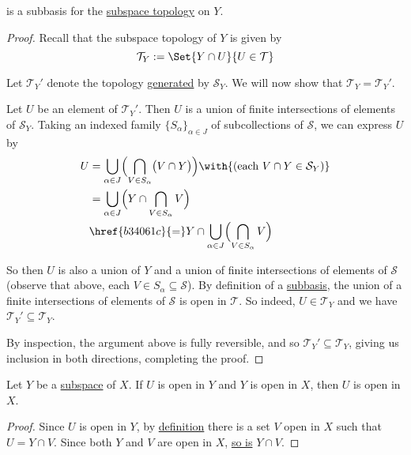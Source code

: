 is a subbasis for the \href{cddfbd8}{subspace topology} on $Y$.

\begin{proof}
  \def\T{\mathcal T}\def\TY{\mathcal T_Y}
  \def\S{\mathcal S}\def\SY{\mathcal S_Y}

  Recall that the subspace topology of $Y$ is given by
  $$
    \TY:=\Set{Y\cap U}{U\in\T}
  $$

  Let $\TY'$ denote the topology \href{d1d3329}{generated} by $\SY$. We will
  now show that $\TY=\TY'$.

  Let $U$ be an element of $\TY'$. Then $U$ is a union of finite intersections
  of elements of $\SY$. Taking an indexed family $\{S_\alpha\}_{\alpha\in J}$
  of subcollections of $\S$, we can express $U$ by
  \begin{align*}
    U &=\bigcup_{\alpha\in J}\Bigl(\bigcap_{V\in S_\alpha}\bigl(V\cap Y\bigr)\Bigr)\with{(\text{each }V\cap Y\in\SY)} \\
      &=\bigcup_{\alpha\in J}\Bigl(Y\cap\bigcap_{V\in S_\alpha}V\Bigr)                                                \\
      &\href{b34061c}{=}Y\cap\bigcup_{\alpha\in J}\Bigl(\bigcap_{V\in S_\alpha}V\Bigr)
  \end{align*}

  So then $U$ is also a union of $Y$ and a union of finite intersections of
  elements of $\S$ (observe that above, each $V\in S_\alpha\subseteq\S$). By
  definition of a \href{d1d3329}{subbasis}, the union of a finite intersections
  of elements of $\S$ is open in $\T$. So indeed, $U\in\TY$ and we have
  $\TY'\subseteq\TY$.

  By inspection, the argument above is fully reversible, and so
  $\TY'\subseteq\TY$, giving us inclusion in both directions, completing the
  proof.
\end{proof}

\label{b9eeb21}

Let $Y$ be a \href{cddfbd8}{subspace} of $X$. If $U$ is open in $Y$ and $Y$ is
open in $X$, then $U$ is open in $X$.

\begin{proof}
  Since $U$ is open in $Y$, by \href{cddfbd8}{definition} there is a set $V$
  open in $X$ such that $U=Y\cap V$. Since both $Y$ and $V$ are open in $X$,
  \href{cc8eb8b}{so is} $Y\cap V$.
\end{proof}

\label{f7ed5a3}

